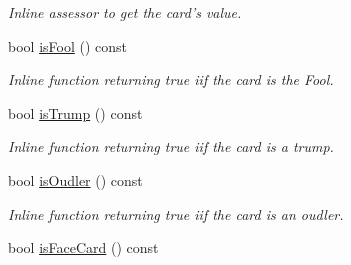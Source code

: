 \begin{DoxyCompactItemize}
\begin{DoxyCompactList}\small\item\em \-Inline assessor to get the card's value. \end{DoxyCompactList}\item 
\hypertarget{classCard_aa05732992ee8352a205a15d89f4edda4}{bool \hyperlink{classCard_aa05732992ee8352a205a15d89f4edda4}{is\-Fool} () const }\label{classCard_aa05732992ee8352a205a15d89f4edda4}

\begin{DoxyCompactList}\small\item\em \-Inline function returning true iif the card is the \-Fool. \end{DoxyCompactList}\item 
\hypertarget{classCard_ad9674d010674d0a536994147696abc6d}{bool \hyperlink{classCard_ad9674d010674d0a536994147696abc6d}{is\-Trump} () const }\label{classCard_ad9674d010674d0a536994147696abc6d}

\begin{DoxyCompactList}\small\item\em \-Inline function returning true iif the card is a trump. \end{DoxyCompactList}\item 
\hypertarget{classCard_a8ac4b04ac18721afdff8d504a7621a97}{bool \hyperlink{classCard_a8ac4b04ac18721afdff8d504a7621a97}{is\-Oudler} () const }\label{classCard_a8ac4b04ac18721afdff8d504a7621a97}

\begin{DoxyCompactList}\small\item\em \-Inline function returning true iif the card is an oudler. \end{DoxyCompactList}\item 
\hypertarget{classCard_ac8978fa4de9e59246381ebd2f9c5ecfc}{bool \hyperlink{classCard_ac8978fa4de9e59246381ebd2f9c5ecfc}{is\-Face\-Card} () const }\label{classCard_ac8978fa4de9e59246381ebd2f9c5ecfc}


\end{DoxyCompactItemize}
